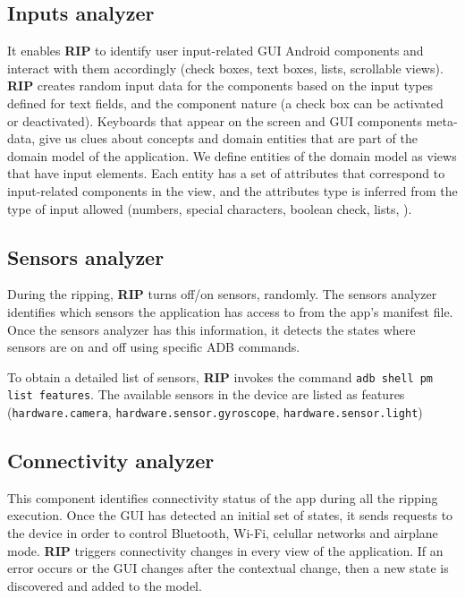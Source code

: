 

\subsection{Inputs analyzer}

It enables \textbf{RIP} to identify user input-related GUI Android components and interact with them accordingly (\eg check boxes, text boxes, lists, scrollable views).  \textbf{RIP} creates random input data for the components based on the input types defined for text fields, and the component nature (\eg a check box can be activated or deactivated). Keyboards that appear on the screen and GUI components meta-data, give us clues about concepts and domain entities that are part of the domain model of the application. 
We define entities of the domain model as views that have input elements. Each entity has a set of attributes that correspond to input-related components in the view, and the attributes type is inferred from the type of input allowed (\eg numbers, special characters, boolean check, lists, \etc). 

\subsection{Sensors analyzer}

During the ripping, \textbf{RIP}  turns off/on sensors, randomly. The sensors analyzer identifies which sensors the application has access to from the app's manifest file. Once the sensors analyzer has this information, it detects the states where sensors are on and off using specific ADB commands. 

To obtain a detailed list of sensors, \textbf{RIP} invokes the command \texttt {adb shell pm list features}. The available sensors in the device are listed as features (\eg \verb|hardware.camera|,  \verb|hardware.sensor.gyroscope|, \verb|hardware.sensor.light|)

\subsection{Connectivity analyzer}

This component identifies connectivity status of the app during all the ripping execution. Once the GUI has detected an initial set of states, it sends requests to the device in order to control Bluetooth, Wi-Fi, celullar networks and airplane mode. \textbf{RIP} triggers connectivity changes in every view of the application. If an error occurs or the GUI changes after the contextual change, then a new state is  discovered and added to the model.

